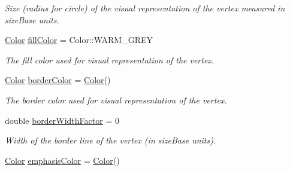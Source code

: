 \begin{DoxyCompactItemize}
\begin{DoxyCompactList}\small\item\em Size (radius for circle) of the visual representation of the vertex measured in size\+Base units. \end{DoxyCompactList}\item 
\hyperlink{namespaceslb_1_1core_1_1util_afae144e1a65658559242f5cf4fce426f}{Color} \hyperlink{structslb_1_1core_1_1ui_1_1VertexStyle_aa9b25d40fc42e8e8f40883da3f441f19}{fill\+Color} = Color\+::\+W\+A\+R\+M\+\_\+\+G\+R\+EY\hypertarget{structslb_1_1core_1_1ui_1_1VertexStyle_aa9b25d40fc42e8e8f40883da3f441f19}{}\label{structslb_1_1core_1_1ui_1_1VertexStyle_aa9b25d40fc42e8e8f40883da3f441f19}

\begin{DoxyCompactList}\small\item\em The fill color used for visual representation of the vertex. \end{DoxyCompactList}\item 
\hyperlink{namespaceslb_1_1core_1_1util_afae144e1a65658559242f5cf4fce426f}{Color} \hyperlink{structslb_1_1core_1_1ui_1_1VertexStyle_a2d1624ba9de0866e8fb51d7ce0d0187c}{border\+Color} = \hyperlink{namespaceslb_1_1core_1_1util_afae144e1a65658559242f5cf4fce426f}{Color}()\hypertarget{structslb_1_1core_1_1ui_1_1VertexStyle_a2d1624ba9de0866e8fb51d7ce0d0187c}{}\label{structslb_1_1core_1_1ui_1_1VertexStyle_a2d1624ba9de0866e8fb51d7ce0d0187c}

\begin{DoxyCompactList}\small\item\em The border color used for visual representation of the vertex. \end{DoxyCompactList}\item 
double \hyperlink{structslb_1_1core_1_1ui_1_1VertexStyle_acede36c516cb2c27d20adf85dd51f170}{border\+Width\+Factor} = 0\hypertarget{structslb_1_1core_1_1ui_1_1VertexStyle_acede36c516cb2c27d20adf85dd51f170}{}\label{structslb_1_1core_1_1ui_1_1VertexStyle_acede36c516cb2c27d20adf85dd51f170}

\begin{DoxyCompactList}\small\item\em Width of the border line of the vertex (in size\+Base units). \end{DoxyCompactList}\item 
\hyperlink{namespaceslb_1_1core_1_1util_afae144e1a65658559242f5cf4fce426f}{Color} \hyperlink{structslb_1_1core_1_1ui_1_1VertexStyle_a8c52e3026f1c6042f8d26442462c0f3d}{emphasis\+Color} = \hyperlink{namespaceslb_1_1core_1_1util_afae144e1a65658559242f5cf4fce426f}{Color}()\hypertarget{structslb_1_1core_1_1ui_1_1VertexStyle_a8c52e3026f1c6042f8d26442462c0f3d}{}\label{structslb_1_1core_1_1ui_1_1VertexStyle_a8c52e3026f1c6042f8d26442462c0f3d}


\end{DoxyCompactItemize}
